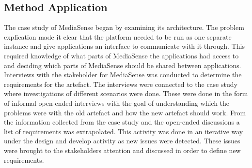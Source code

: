 \subsection{Method Application}
The case study of MediaSense began by examining its architecture. The problem explication made it clear that the platform needed to be run as one separate instance and give applications an interface to communicate with it through. This required knowledge of what parts of MediaSense the applications had access to and deciding which parts of MediaSense should be shared between applications. Interviews with the stakeholder for MediaSense was conducted to determine the requirements for the artefact. The interviews were connected to the case study where investigations of different scenarios were done. These were done in the form of informal open-ended interviews with the goal of understanding which the problems were with the old artefact and how the new artefact should work. 
From the information collected from the case study and the open-ended discussions a list of requirements was extrapolated. This activity was done in an iterative way under the design and develop activity as new issues were detected. These issues were brought to the stakeholders attention and discussed in order to define new requirements.
